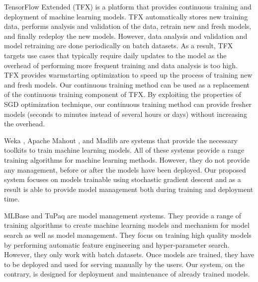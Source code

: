 TensorFlow Extended (TFX) is a platform that provides continuous training and deployment of machine learning models.
TFX automatically stores new training data, performs analysis and validation of the data, retrain new and fresh models, and finally redeploy the new models. 
However, data analysis and validation and model retraining are done periodically on batch datasets.
As a result, TFX targets use cases that typically require daily updates to the model as the overhead of performing more frequent training and data analysis is too high.
TFX provides warmstarting optimization to speed up the process of training new and fresh models.
Our continuous training method can be used as a replacement of the continuous training component of TFX.
By exploiting the properties of SGD optimization technique, our continuous training method can provide fresher models (seconds to minutes instead of several hours or days) without increasing the overhead.

Weka \cite{hall2009weka}, Apache Mahout \cite{Owen:2011:MA:2132656}, and Madlib \cite{hellerstein2012madlib} are systems that provide the necessary toolkits to train machine learning models. 
All of these systems provide a range training algorithms for machine learning methods. 
However, they do not provide any management, before or after the models have been deployed. 
Our proposed system focuses on models trainable using stochastic gradient descent and as a result is able to provide model management both during training and deployment time.

MLBase \cite{kraska2013mlbase} and TuPaq \cite{sparks2015tupaq} are model management systems.
They provide a range of training algorithms to create machine learning models and mechanism for model search as well as model management.
They focus on training high quality models by performing automatic feature engineering and hyper-parameter search.
However, they only work with batch datasets.
Once models are trained, they have to be deployed and used for serving manually by the users.
Our system, on the contrary, is designed for deployment and maintenance of already trained models.
